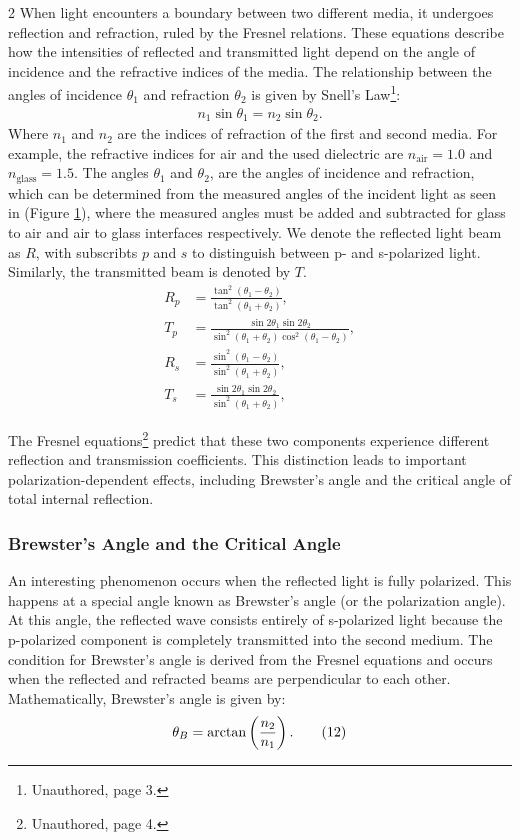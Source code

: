 \documentclass[a4paper,oneside,article]{memoir}
\newcommand{\br}[2][1]{%
    \ifcase#1
    \or \left( #2 \right) %
    \or \left[ #2 \right] %
    \or \left\langle #2 \right\rangle %
    \or \left\{ #2 \right\} %
    \or \left| #2 \right| %
    \fi
}
\newcommand{\eq}[1]{\label{eq#1}\tag{#1}}
\begin{document}
\begin{multicols}{2}
When light encounters a boundary between two different media, it undergoes reflection and refraction, ruled by the Fresnel relations. These equations describe how the intensities of reflected and transmitted light depend on the angle of incidence and the refractive indices of the media. 
The relationship between the angles of incidence $\theta_1$
and refraction $\theta_2$ is given by Snell’s Law\footnote{Unauthored, page 3.}:
\begin{align*}
    n_1 \sin\theta_1 = n_2 \sin\theta_2. 
\end{align*}
Where $n_1$ and $n_2$ are the indices of refraction of the first and second media. For example, the refractive indices for air and the used dielectric are $n_{\text{air}} = 1.0$ and $n_{\text{glass}} = 1.5$. The angles $θ_1$ and $θ_2$, are the angles of incidence and refraction, which can be determined from the measured angles of the incident light as seen in (Figure \hyperref[fig:ia]{1}), where the measured angles must be added and subtracted for glass to air and air to glass interfaces respectively.
We denote the reflected light beam as $R$, with subscribts $p$ and $s$ to distinguish between p- and s-polarized light. Similarly, the transmitted beam is denoted by $T$.
\begin{align*}
    R_p &= \frac{\tan^2 (\theta_1 - \theta_2)}{\tan^2 (\theta_1 + \theta_2)},  \eq{7} \\
    T_p &= \frac{\sin 2\theta_1 \sin 2\theta_2}{\sin^2 (\theta_1 + \theta_2) \cos^2 (\theta_1 - \theta_2)},  \eq{8} \\
    R_s &= \frac{\sin^2 (\theta_1 - \theta_2)}{\sin^2 (\theta_1 + \theta_2)},  \eq{9} \\
    T_s &= \frac{\sin 2\theta_1 \sin 2\theta_2}{\sin^2 (\theta_1 + \theta_2)},  \eq{10}
\end{align*}

The Fresnel equations\footnote{Unauthored, page 4.} predict that these two components experience different reflection and transmission coefficients. This distinction leads to important polarization-dependent effects, including Brewster’s angle and the critical angle of total internal reflection.

\subsubsection{Brewster's Angle and the Critical Angle}
An interesting phenomenon occurs when the reflected light is fully polarized. This happens at a special angle known as Brewster’s angle (or the polarization angle). At this angle, the reflected wave consists entirely of s-polarized light because the p-polarized component is completely transmitted into the second medium. The condition for Brewster’s angle is derived from the Fresnel equations and occurs when the reflected and refracted beams are perpendicular to each other. Mathematically, Brewster’s angle is given by:
\begin{align*}
    \theta_B = \arctan\br{\frac{n_2}{n_1}}. \eq{12}
\end{align*}


\end{multicols}
\end{document}
